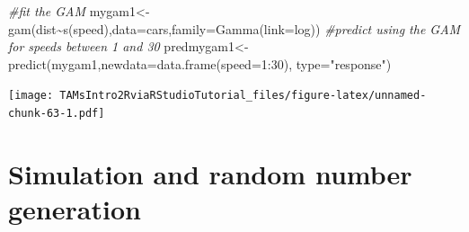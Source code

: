 \documentclass[
]{article}
\newenvironment{Shaded}{\begin{snugshade}}{\end{snugshade}}
\newcommand{\AttributeTok}[1]{\textcolor[rgb]{0.77,0.63,0.00}{#1}}
\newcommand{\CommentTok}[1]{\textcolor[rgb]{0.56,0.35,0.01}{\textit{#1}}}
\newcommand{\DecValTok}[1]{\textcolor[rgb]{0.00,0.00,0.81}{#1}}
\newcommand{\FunctionTok}[1]{\textcolor[rgb]{0.00,0.00,0.00}{#1}}
\newcommand{\NormalTok}[1]{#1}
\newcommand{\OtherTok}[1]{\textcolor[rgb]{0.56,0.35,0.01}{#1}}
\newcommand{\SpecialCharTok}[1]{\textcolor[rgb]{0.00,0.00,0.00}{#1}}
\newcommand{\StringTok}[1]{\textcolor[rgb]{0.31,0.60,0.02}{#1}}
\begin{document}
\begin{Shaded}
\begin{Highlighting}[]
\CommentTok{\#fit the GAM}
\NormalTok{mygam1}\OtherTok{\textless{}{-}}\FunctionTok{gam}\NormalTok{(dist}\SpecialCharTok{\textasciitilde{}}\FunctionTok{s}\NormalTok{(speed),}\AttributeTok{data=}\NormalTok{cars,}\AttributeTok{family=}\FunctionTok{Gamma}\NormalTok{(}\AttributeTok{link=}\NormalTok{log))}
\CommentTok{\#predict using the GAM for speeds between 1 and 30}
\NormalTok{predmygam1}\OtherTok{\textless{}{-}}\FunctionTok{predict}\NormalTok{(mygam1,}\AttributeTok{newdata=}\FunctionTok{data.frame}\NormalTok{(}\AttributeTok{speed=}\DecValTok{1}\SpecialCharTok{:}\DecValTok{30}\NormalTok{),}
\AttributeTok{type=}\StringTok{"response"}\NormalTok{)}
\end{Highlighting}
\end{Shaded}

\begin{Shaded}
\end{Shaded}

\texttt{[image: TAMsIntro2RviaRStudioTutorial\_files/figure-latex/unnamed-chunk-63-1.pdf]}

\hypertarget{simulation-and-random-number-generation}{%
\section{Simulation and random number
generation}\label{simulation-and-random-number-generation}}
\end{document}
